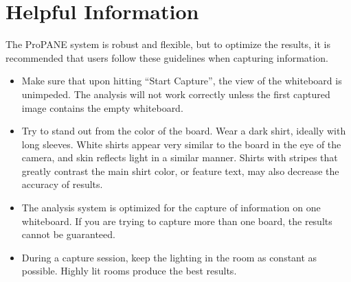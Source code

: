 \documentclass[]{article}
\begin{document}
		
		\section{Helpful Information}
		The ProPANE system is robust and flexible, but to optimize the results, it is recommended that users follow these guidelines when capturing information.
		
		\begin{itemize}
		\item{Make sure that upon hitting ``Start Capture'', the view of the whiteboard is unimpeded.  The analysis will not work correctly unless the first captured image contains the empty whiteboard. }
		\item{Try to stand out from the color of the board.  Wear a dark shirt, ideally with long sleeves.  White shirts appear very similar to the board in the eye of the camera, and skin reflects light in a similar manner.  Shirts with stripes that greatly contrast the main shirt color, or feature text, may also decrease the accuracy of results.}
		\item{The analysis system is optimized for the capture of information on one whiteboard.  If you are trying to capture more than one board, the results cannot be guaranteed. }
		\item{During a capture session, keep the lighting in the room as constant as possible.  Highly lit rooms produce the best results.}
		
		\end{itemize}
		
\end{document}
